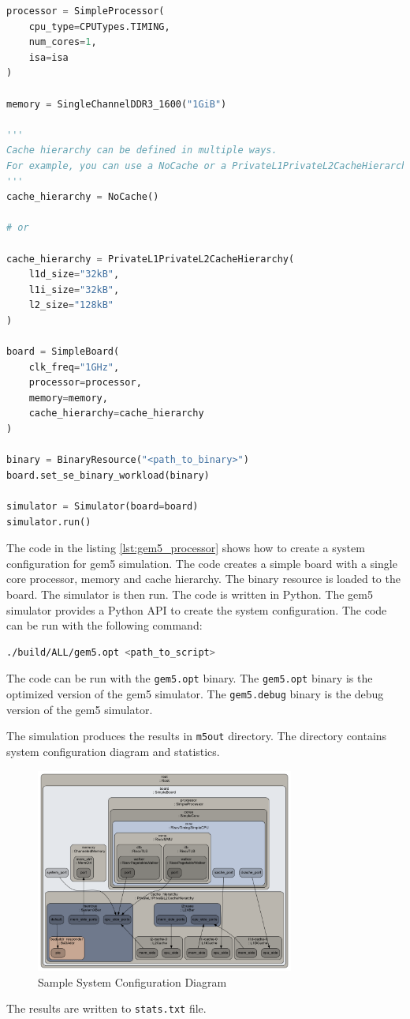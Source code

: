 \begin{lstlisting}[language=python, caption={Creating System Configuration for GEM5 simulation}, label={lst:gem5_processor}]
processor = SimpleProcessor(
    cpu_type=CPUTypes.TIMING,
    num_cores=1,
    isa=isa
)

memory = SingleChannelDDR3_1600("1GiB")

'''
Cache hierarchy can be defined in multiple ways.
For example, you can use a NoCache or a PrivateL1PrivateL2CacheHierarchy.
'''
cache_hierarchy = NoCache()

# or

cache_hierarchy = PrivateL1PrivateL2CacheHierarchy(
    l1d_size="32kB",
    l1i_size="32kB",
    l2_size="128kB"
)

board = SimpleBoard(
    clk_freq="1GHz",
    processor=processor,
    memory=memory,
    cache_hierarchy=cache_hierarchy
)

binary = BinaryResource("<path_to_binary>")
board.set_se_binary_workload(binary)

simulator = Simulator(board=board)
simulator.run()
\end{lstlisting}

The code in the listing \ref{lst:gem5_processor} shows how to create a system configuration for gem5 simulation. The code creates a simple board with a single core processor, memory and cache hierarchy. The binary resource is loaded to the board. The simulator is then run.
The code is written in Python. The gem5 simulator provides a Python API to create the system configuration. The code can be run with the following command:
\begin{lstlisting}[language=bash, caption={Running the simulation}, label={lst:gem5_run}]
./build/ALL/gem5.opt <path_to_script>
\end{lstlisting}
The code can be run with the \texttt{gem5.opt} binary. The \texttt{gem5.opt} binary is the optimized version of the gem5 simulator. The \texttt{gem5.debug} binary is the debug version of the gem5 simulator.

The simulation produces the results in \texttt{m5out} directory. The directory contains system configuration diagram and statistics.
\begin{figure}[h]
	\centering
	\includegraphics[width=8.5cm]{figs/config.dot.png}
	\caption{Sample System Configuration Diagram}
	\label{fig:system_config}
\end{figure}
The results are written to \texttt{stats.txt} file.

